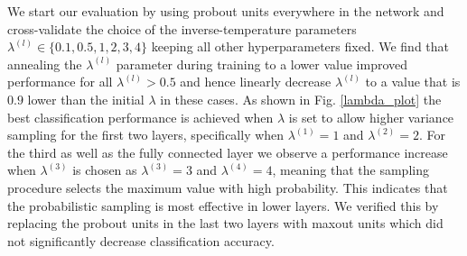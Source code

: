 \documentclass{article} \pdfoutput=1
\begin{document}
We start our evaluation by using probout units everywhere in the
network and cross-validate the choice of the inverse-temperature
parameters $\lambda^{(l)} \in \{ 0.1, 0.5, 1, 2, 3, 4 \}$ keeping all
other hyperparameters fixed. We find that annealing the
$\lambda^{(l)}$ parameter during training to a lower value improved
performance for all $\lambda^{(l)} > 0.5$ and hence linearly decrease
$\lambda^{(l)}$ to a value that is $0.9$ lower than the initial
$\lambda$ in these cases. As shown in Fig. \ref{lambda_plot} the best
classification performance is achieved when $\lambda$ is set to allow
higher variance sampling for the first two layers, specifically when
$\lambda^{(1)} = 1$ and $\lambda^{(2)} = 2$. For the third as well as
the fully connected layer we observe a performance increase when
$\lambda^{(3)}$ is chosen as $\lambda^{(3)} = 3$ and $\lambda^{(4)} =
4$, meaning that the sampling procedure selects the maximum value with
high probability. This indicates that the probabilistic sampling is
most effective in lower layers.  We verified this by replacing the
probout units in the last two layers with maxout units which did not
significantly decrease classification accuracy.
\end{document}
